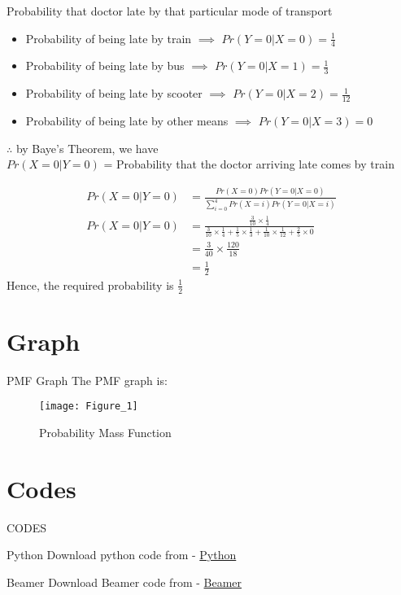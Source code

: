 \documentclass{beamer}
\begin{document}
\begin{frame}
Probability that doctor late by that particular mode of transport
\begin{itemize}
	\item Probability of being late by train $\implies$ $Pr(Y = 0|X = 0) = \frac{1}{4}$
	\item Probability of being late by bus $\implies$ $Pr(Y = 0|X = 1) = \frac{1}{3}$ 
	\item Probability of being late by scooter $\implies$ $Pr(Y = 0|X = 2) = \frac{1}{12}$
	\item Probability of being late by other means $\implies$ $Pr(Y = 0|X = 3) = 0$ \end{itemize}

\end{frame}

\begin{frame}
$\therefore$ by Baye's Theorem, we have \\
$Pr(X=0|Y=0)$ = Probability that the doctor arriving late comes by train 

\begin{align}
Pr(X=0|Y=0)& = \frac{Pr(X=0)Pr(Y=0|X=0)}{\sum_{i=0}^4 Pr(X=i)Pr(Y=0|X=i)} \\
Pr(X=0|Y=0) &= \frac{\frac{3}{10}\times \frac{1}{4}}{\frac{3}{10}\times \frac{1}{4}+\frac{1}{5} \times \frac{1}{3}+\frac{1}{10} \times \frac{1}{12}+\frac{2}{5}\times 0} \\
&= \frac{3}{40}\times \frac{120}{18} \\
&= \frac{1}{2}
\end{align} 
Hence, the required probability is $\frac{1}{2}$
\end{frame}

\section{Graph}
\begin{frame}{PMF Graph}
The PMF graph is:
    \begin{figure}[!ht]
		\centering
		\texttt{[image: Figure\_1]}
		\caption{Probability Mass Function}
		\label{fig1}
	\end{figure}
\end{frame}


\section{Codes}
\begin{frame}{CODES}
    \begin{block}{Python}
         Download python code from - \href{https://github.com/jarpula-Bhanu/Assignment-6/blob/main/code/verify.py}{Python}
    \end{block}

 \begin{block}{Beamer}
         Download Beamer code from - \href{https://github.com/jarpula-Bhanu/Assignment-6/blob/main/Beamer.tex}{Beamer}
    \end{block}
\end{frame} 
\end{document}
